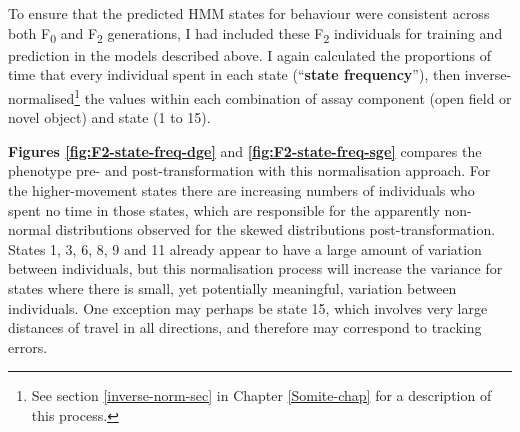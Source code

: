 \documentclass[
]{book}
\begin{document}
To ensure that the predicted HMM states for behaviour were consistent across both F\textsubscript{0} and F\textsubscript{2} generations, I had included these F\textsubscript{2} individuals for training and prediction in the models described above. I again calculated the proportions of time that every individual spent in each state (``\textbf{state frequency}''), then inverse-normalised\footnote{See section \ref{inverse-norm-sec} in Chapter \ref{Somite-chap} for a description of this process.} the values within each combination of assay component (open field or novel object) and state (1 to 15).

\textbf{Figures \ref{fig:F2-state-freq-dge}} and \textbf{\ref{fig:F2-state-freq-sge}} compares the phenotype pre- and post-transformation with this normalisation approach. For the higher-movement states there are increasing numbers of individuals who spent no time in those states, which are responsible for the apparently non-normal distributions observed for the skewed distributions post-transformation. States 1, 3, 6, 8, 9 and 11 already appear to have a large amount of variation between individuals, but this normalisation process will increase the variance for states where there is small, yet potentially meaningful, variation between individuals. One exception may perhaps be state 15, which involves very large distances of travel in all directions, and therefore may correspond to tracking errors.
\end{document}
